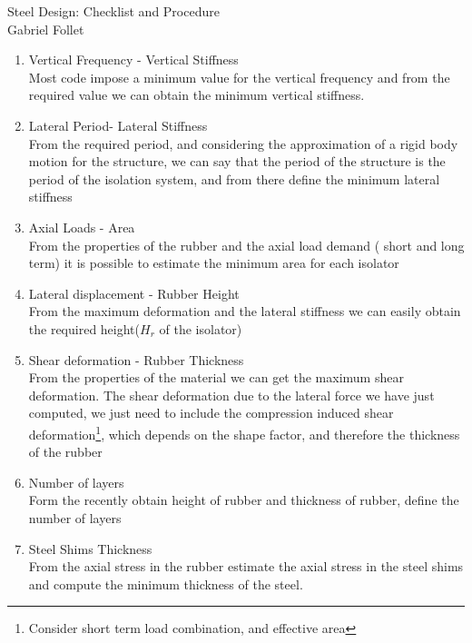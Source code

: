 \documentclass{article}
\begin{document}
\newpage
\pagestyle{fancy}
\fancyhf{}
\setcounter{page}{1} 
\fancyfoot[R]{\thepage}

\newpage
\begin{center}
\Large{Steel Design: Checklist and Procedure}\\
\vspace{0.3cm}
\large{Gabriel Follet}\\
\vspace{0.5cm}
\end{center}
\begin{enumerate}
\item{Vertical Frequency - Vertical Stiffness}\\
Most code impose a minimum value for the vertical frequency  and from the required value we can obtain the minimum vertical stiffness.
\item{Lateral Period- Lateral Stiffness}\\
From the required period, and considering the approximation of a rigid body motion for the structure, we can say that the period of the structure is the period of the isolation system, and from there define the minimum lateral stiffness
\item{Axial Loads - Area}\\
From the properties of the rubber and the axial load demand ( short and long term) it is possible to estimate the minimum area for each isolator
\item{Lateral displacement - Rubber Height}\\
From the maximum deformation and the lateral stiffness we can easily obtain the required  height($H_r$ of the isolator)
\item{Shear deformation - Rubber Thickness}\\
From the properties of the material we can get the maximum shear deformation. The shear deformation due to the lateral force we have just computed, we just need to include the compression induced shear deformation\footnote{Consider short term load combination, and effective area}, which depends on the shape factor, and therefore the thickness of the rubber
\item{Number of layers}\\
Form the recently obtain height of rubber and thickness of rubber, define the number of layers
\item {Steel Shims Thickness}\\
From the axial stress in the rubber estimate the axial stress in the steel shims and compute the minimum thickness of the steel.

\end{enumerate}
\end{document}
